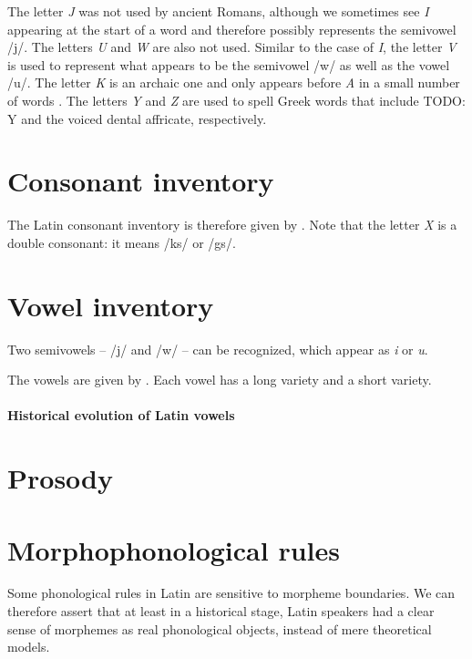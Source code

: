 \documentclass[a4paper, oneside, 12pt]{report}
\newcommand*{\citechap}[1]{chap.~{#1}}
\newcommand*{\citetable}[1]{Table~{#1}}
\newcommand{\form}[1]{\emph{#1}}
\begin{document}
The letter \form{J} was not used by ancient Romans, 
although we sometimes see \form{I} appearing at the start of a word 
and therefore possibly represents the semivowel /j/.
The letters \form{U} and \form{W} are also not used.
Similar to the case of \form{I},
the letter \form{V} is used to represent 
what appears to be the semivowel /w/ 
as well as the vowel /u/. 
The letter \form{K} is an archaic one 
and only appears before \form{A} in a small number of words
\citep[\citechap{2}]{oniga2014latin}.
The letters \form{Y} and \form{Z} are used to spell Greek words that 
include TODO: Y and the voiced dental affricate, respectively.


\section{Consonant inventory}

The Latin consonant inventory is therefore given by \citet[\citetable{3.1}]{oniga2014latin}.
Note that the letter \form{X} is a double consonant: 
it means /ks/ or /gs/.

\section{Vowel inventory}

Two semivowels -- /j/ and /w/ -- can be recognized,
which appear as \form{i} or \form{u}.

The vowels are given by \citet[\citetable{3.2}]{oniga2014latin}.
Each vowel has a long variety and a short variety.

\paragraph*{Historical evolution of Latin vowels}


\section{Prosody}



\section{Morphophonological rules}\label{sec:phonology.morphological}

Some phonological rules in Latin are sensitive to morpheme boundaries.
We can therefore assert that at least in a historical stage, 
Latin speakers had a clear sense of morphemes 
as real phonological objects,
instead of mere theoretical models.
\end{document}
